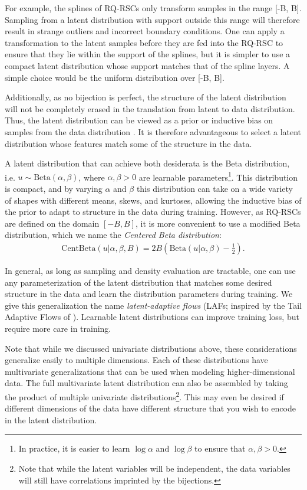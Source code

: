 \documentclass[twocolumn,twocolappendix]{aastex631}
\begin{document}
For example, the splines of RQ-RSCs only transform samples in the range [-B, B].
Sampling from a latent distribution with support outside this range will therefore result in strange outliers and incorrect boundary conditions.
One can apply a transformation to the latent samples before they are fed into the RQ-RSC to ensure that they lie within the support of the splines, but it is simpler to use a compact latent distribution whose support matches that of the spline layers.
A simple choice would be the uniform distribution over [-B, B].

Additionally, as no bijection is perfect, the structure of the latent distribution will not be completely erased in the translation from latent to data distribution.
Thus, the latent distribution can be viewed as a prior or inductive bias on samples from the data distribution \citep{jaini2020}.
It is therefore advantageous to select a latent distribution whose features match some of the structure in the data.

A latent distribution that can achieve both desiderata is the Beta distribution, i.e. $u \sim \mathrm{Beta}(\alpha, \beta)$, where $\alpha, \beta > 0$ are learnable parameters\footnote{In practice, it is easier to learn $\log\alpha$ and $\log\beta$ to ensure that $\alpha, \beta > 0$.}.
This distribution is compact, and by varying $\alpha$ and $\beta$ this distribution can take on a wide variety of shapes with different means, skews, and kurtoses, allowing the inductive bias of the prior to adapt to structure in the data during training.
However, as RQ-RSCs are defined on the domain $[-B, B]$, it is more convenient to use a modified Beta distribution, which we name the \emph{Centered Beta distribution}:
\begin{align}
    \text{CentBeta}(u | \alpha, \beta, B) = 2B\left(\text{Beta}(u|\alpha, \beta) - \frac{1}{2}\right).
\end{align}

In general, as long as sampling and density evaluation are tractable, one can use any parameterization of the latent distribution that matches some desired structure in the data and learn the distribution parameters during training.
We give this generalization the name \emph{latent-adaptive flows} (LAFs; inspired by the Tail Adaptive Flows of \citealt{jaini2020}).
Learnable latent distributions can improve training loss, but require more care in training.

Note that while we discussed univariate distributions above, these considerations generalize easily to multiple dimensions.
Each of these distributions have multivariate generalizations that can be used when modeling higher-dimensional data.
The full multivariate latent distribution can also be assembled by taking the product of multiple univariate distributions\footnote{Note that while the latent variables will be independent, the data variables will still have correlations imprinted by the bijections.}.
This may even be desired if different dimensions of the data have different structure that you wish to encode in the latent distribution.
\end{document}
